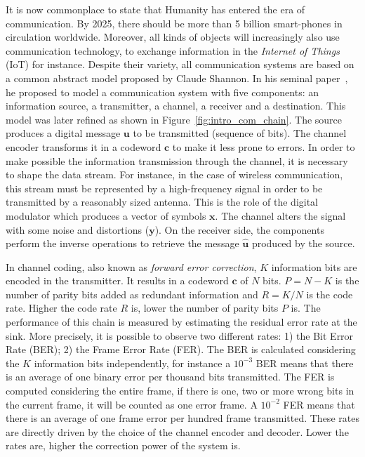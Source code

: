 It is now commonplace to state that Humanity has entered the era of
communication. By 2025, there should be more than 5 billion smart-phones in
circulation worldwide. Moreover, all kinds of objects will increasingly also use
communication technology, to exchange information in the \emph{Internet of
Things} (IoT) for instance. Despite their variety, all communication systems are
based on a common abstract model proposed by Claude Shannon. In his seminal
paper~\cite{Shannon1948}, he proposed to model a communication system with five
components: an information source, a transmitter, a channel, a receiver and a
destination. This model was later refined as shown in
Figure~\ref{fig:intro_com_chain}. The source produces a digital message $\bm{u}$
to be transmitted (sequence of bits). The channel encoder transforms it in a
codeword $\bm{c}$ to make it less prone to errors. In order to make possible the
information transmission through the channel, it is necessary to shape the data
stream. For instance, in the case of wireless communication, this stream must be
represented by a high-frequency signal in order to be transmitted by a
reasonably sized antenna. This is the role of the digital modulator which
produces a vector of symbols $\bm{x}$. The channel alters the signal with some
noise and distortions ($\bm{y}$). On the receiver side, the components perform
the inverse operations to retrieve the message $\bm{\hat{u}}$ produced by the
source.

In channel coding, also known as \emph{forward error correction}, $K$
information bits  are encoded in the transmitter. It results in a codeword
$\bm{c}$ of $N$ bits. $P = N - K$ is the number of parity bits added as
redundant information and $R = K/N$ is the code rate. Higher the code rate $R$
is, lower the number of parity bits $P$ is. The performance of this chain is
measured by estimating the residual error rate at the sink. More precisely, it
is possible to observe two different rates: 1) the Bit Error Rate (BER); 2) the
Frame Error Rate (FER). The BER is calculated considering the $K$ information
bits independently, for instance a $10^{-3}$ BER means that there is an average
of one binary error per thousand bits transmitted. The FER is computed
considering the entire frame, if there is one, two or more wrong bits in the
current frame, it will be counted as one error frame. A $10^{-2}$ FER means that
there is an average of one frame error per hundred frame transmitted. These
rates are directly driven by the choice of the channel encoder and decoder.
Lower the rates are, higher the correction power of the system is.

